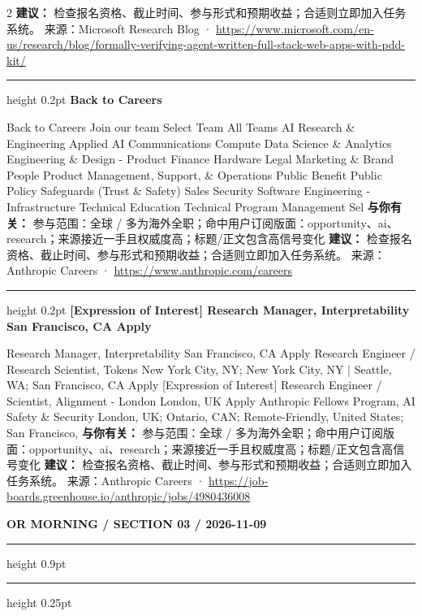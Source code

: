 \documentclass[10.5pt]{ctexart}
\begin{document}
\begin{multicols}{2}
\textbf{建议：} 检查报名资格、截止时间、参与形式和预期收益；合适则立即加入任务系统。
{\footnotesize\color{ormuted} 来源：Microsoft Research Blog · \url{https://www.microsoft.com/en-us/research/blog/formally-verifying-agent-written-full-stack-web-apps-with-pdd-kit/}}
\vspace{2mm}
\hrule height 0.2pt
\vspace{2mm}
{\large\bfseries Back to Careers}\par
Back to Careers Join our team Select Team All Teams AI Research \& Engineering Applied AI Communications Compute Data Science \& Analytics Engineering \& Design - Product Finance Hardware Legal Marketing \& Brand People Product Management, Support, \& Operations Public Benefit Public Policy Safeguards (Trust \& Safety) Sales Security Software Engineering - Infrastructure Technical Education Technical Program Management Sel
\textbf{与你有关：} 参与范围：全球 / 多为海外全职；命中用户订阅版面：opportunity、ai、research；来源接近一手且权威度高；标题/正文包含高信号变化
\textbf{建议：} 检查报名资格、截止时间、参与形式和预期收益；合适则立即加入任务系统。
{\footnotesize\color{ormuted} 来源：Anthropic Careers · \url{https://www.anthropic.com/careers}}
\vspace{2mm}
\hrule height 0.2pt
\vspace{2mm}
{\large\bfseries [Expression of Interest] Research Manager, Interpretability San Francisco, CA Apply}\par
[Expression of Interest] Research Manager, Interpretability San Francisco, CA Apply Research Engineer / Research Scientist, Tokens New York City, NY; New York City, NY | Seattle, WA; San Francisco, CA Apply [Expression of Interest] Research Engineer / Scientist, Alignment - London London, UK Apply Anthropic Fellows Program, AI Safety \& Security London, UK; Ontario, CAN; Remote-Friendly, United States; San Francisco, 
\textbf{与你有关：} 参与范围：全球 / 多为海外全职；命中用户订阅版面：opportunity、ai、research；来源接近一手且权威度高；标题/正文包含高信号变化
\textbf{建议：} 检查报名资格、截止时间、参与形式和预期收益；合适则立即加入任务系统。
{\footnotesize\color{ormuted} 来源：Anthropic Careers · \url{https://job-boards.greenhouse.io/anthropic/jobs/4980436008}}
\end{multicols}
\newpage
{\small\bfseries OR MORNING / SECTION 03 / 2026-11-09}
\vspace{2mm}
\hrule height 0.9pt
\vspace{1.5mm}
\hrule height 0.25pt
\vspace{4mm}
\end{document}
